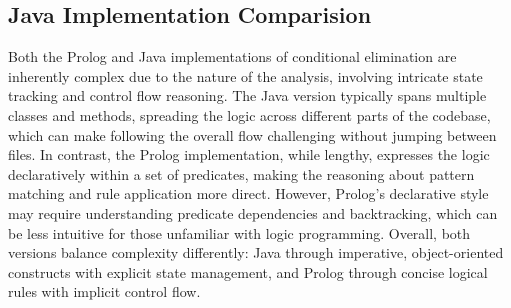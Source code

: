 \subsection*{Java Implementation Comparision}
Both the Prolog and Java implementations of conditional elimination are inherently complex due to the nature of the analysis, involving intricate state tracking and control flow reasoning. The Java version typically spans multiple classes and methods, spreading the logic across different parts of the codebase, which can make following the overall flow challenging without jumping between files. In contrast, the Prolog implementation, while lengthy, expresses the logic declaratively within a set of predicates, making the reasoning about pattern matching and rule application more direct. However, Prolog’s declarative style may require understanding predicate dependencies and backtracking, which can be less intuitive for those unfamiliar with logic programming. Overall, both versions balance complexity differently: Java through imperative, object-oriented constructs with explicit state management, and Prolog through concise logical rules with implicit control flow.